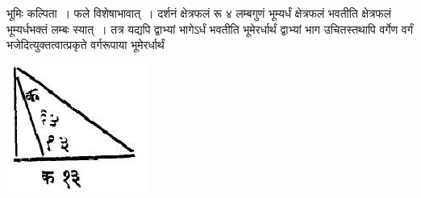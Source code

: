 \documentclass[11pt, openany]{book}
\begin{document}
\begin{flushleft}
\begin{minipage}[c]{0.7\textwidth}
भूमिः कल्पिता~। फले विशेषाभावात्~। दर्शनं क्षेत्रफलं रू ४ लम्बगुणं भूम्यर्धं क्षेत्रफलं भवतीति क्षेत्रफलं भूम्यर्धभक्तं लम्बः स्यात्~। तत्र यद्यपि द्वाभ्यां भागेऽर्धं भवतीति भूमेरर्धार्थं द्वाभ्यां भाग उचितस्तथापि वर्गेण वर्गं भजेदित्युक्तत्वात्प्रकृते वर्गरूपाया भूमेरर्धार्थं
\end{minipage} 
\hfill
\begin{minipage}{0.25\textwidth} 
\includegraphics[scale=0.65]{Graphics/Capture19.JPG}
\end{minipage} 
\end{flushleft}
\end{document}
